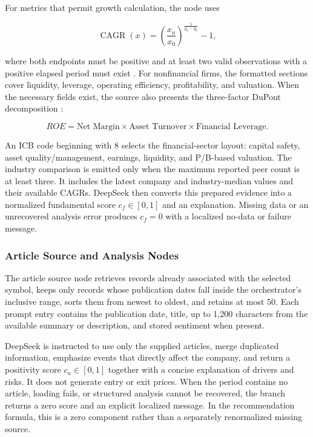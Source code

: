 For metrics that permit growth calculation, the node uses

\begin{equation}
    \operatorname{CAGR}(x) = \left(\frac{x_n}{x_0}\right)^{\frac{1}{y_n-y_0}} - 1,
    \label{eq:fundamental-cagr}
\end{equation}

where both endpoints must be positive and at least two valid observations with a positive elapsed period must exist \cite{damodaranHistoricalGrowth2026}. For nonfinancial firms, the formatted sections cover liquidity, leverage, operating efficiency, profitability, and valuation. When the necessary fields exist, the source also presents the three-factor DuPont decomposition \cite{openstaxDupont2022}:

\begin{equation}
    ROE = \text{Net Margin} \times \text{Asset Turnover} \times \text{Financial Leverage}.
    \label{eq:dupont-stockrium}
\end{equation}

An ICB code beginning with 8 selects the financial-sector layout: capital safety, asset quality/management, earnings, liquidity, and P/B-based valuation. The industry comparison is emitted only when the maximum reported peer count is at least three. It includes the latest company and industry-median values and their available CAGRs. DeepSeek then converts this prepared evidence into a normalized fundamental score $c_f\in[0,1]$ and an explanation. Missing data or an unrecovered analysis error produces $c_f=0$ with a localized no-data or failure message.

\subsubsection{Article Source and Analysis Nodes}
\label{subsubsec:article-analysis-node}

The article source node retrieves records already associated with the selected symbol, keeps only records whose publication dates fall inside the orchestrator's inclusive range, sorts them from newest to oldest, and retains at most 50. Each prompt entry contains the publication date, title, up to 1,200 characters from the available summary or description, and stored sentiment when present.

DeepSeek is instructed to use only the supplied articles, merge duplicated information, emphasize events that directly affect the company, and return a positivity score $c_n\in[0,1]$ together with a concise explanation of drivers and risks. It does not generate entry or exit prices. When the period contains no article, loading fails, or structured analysis cannot be recovered, the branch returns a zero score and an explicit localized message. In the recommendation formula, this is a zero component rather than a separately renormalized missing source.


